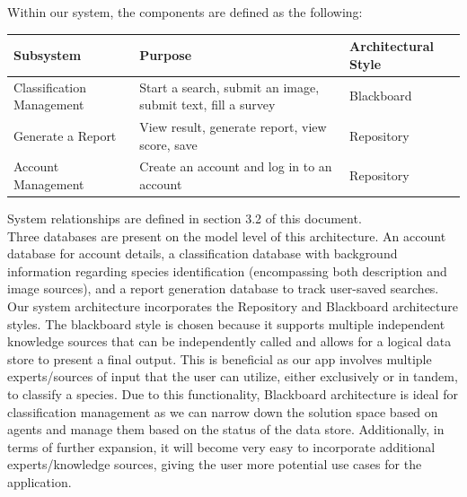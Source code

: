 \documentclass[]{article}
\begin{document}
\begin{table}[h]
Within our system, the components are defined as the following:  
    \centering
    \renewcommand{\arraystretch}{1.3}
    \begin{tabular}{| m{5cm} | m{6cm} | m{4cm} |}
        \hline
        \textbf{Subsystem} & \textbf{Purpose} & \textbf{Architectural Style} \\
        \hline
        Classification Management & Start a search, submit an image, submit text, fill a survey & Blackboard \\
        \hline
        Generate a Report & View result, generate report, view score, save & Repository \\
        \hline
        Account Management & Create an account and log in to an account & Repository \\
        \hline
    \end{tabular}
\end{table}

System relationships are defined in section 3.2 of this document. 
\\

Three databases are present on the model level of this architecture. An account database for account details, a classification database with background information regarding species identification (encompassing both description and image sources), and a report generation database to track user-saved searches. 
\\

Our system architecture incorporates the Repository and Blackboard architecture styles. The blackboard style is chosen because it supports multiple independent knowledge sources that can be independently called and allows for a logical data store to present a final output. This is beneficial as our app involves multiple experts/sources of input that the user can utilize, either exclusively or in tandem, to classify a species. Due to this functionality, Blackboard architecture is ideal for classification management as we can narrow down the solution space based on agents and manage them based on the status of the data store. Additionally, in terms of further expansion, it will become very easy to incorporate additional experts/knowledge sources, giving the user more potential use cases for the application.
\\
\end{document}
